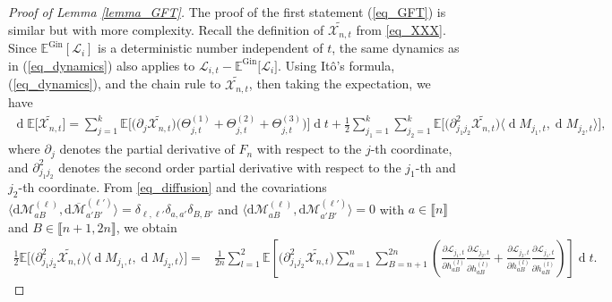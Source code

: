 \documentclass[10pt,reqno]{amsart}
\numberwithin{equation}{section}
\numberwithin{figure}{section}
\theoremstyle{plain}
\newcommand{\wt}{\widetilde}
\newcommand{\<}{\langle}
\renewcommand{\>}{\rangle}
\newcommand{\E}{\mathbb{E}}
\newcommand{\dd}{\operatorname{d}\!{}}
\begin{document}
\begin{proof}[Proof of Lemma \ref{lemma_GFT}]
	
	\medskip
	
	
	
		
	The proof of the first statement (\ref{eq_GFT}) is similar but with more complexity. Recall the definition of $\wt{\mathcal{X}_{n,t}}$ from \eqref{eq_XXX}. Since $\E^{\mathrm{Gin}}[\mathcal{L}_{i}]$ is a deterministic number independent of $t$, the same dynamics as in (\ref{eq_dynamics}) also applies to $\mathcal{L}_{i,t}-\E^{\mathrm{Gin}}\big[\mathcal{L}_{i}\big]$. Using Itô's formula, (\ref{eq_dynamics}), and the chain rule to $\wt{\mathcal{X}_{n,t}}$, then taking the expectation, we have
	\begin{align}\label{eq_derivative}
		\dd \mathbb{E}\big[ \wt{\mathcal{X}_{n,t}}\big]=\sum_{j=1}^k \mathbb{E} \Big[ \big( \partial_{j} \wt{\mathcal{X}_{n,t}}\big) \big( \Theta^{(1)}_{j,t}+\Theta^{(2)}_{j,t}+\Theta^{(3)}_{j,t} \big) \Big] \dd t + \frac{1}{2} \sum_{j_1=1}^k \sum_{j_2=1}^k  \mathbb{E}\Big[ \big(\partial^2_{j_1j_2} \wt{\mathcal{X}_{n,t}} \big) \big\< \dd M_{j_1,t}, \dd M_{j_2,t}  \big\>\Big],
	\end{align}
	 where $\partial_{j}$ denotes the partial derivative of $F_n$ with respect to the $j$-th coordinate, and $\partial^2_{j_1j_2}$ denotes the second order partial derivative with respect to the $j_1$-th and $j_2$-th coordinate. From \eqref{eq_diffusion} and the 
	covariations 
	$\langle \mathrm d \mathcal M_{aB}^{(\ell)}, 
	\mathrm d \overline{\mathcal M}_{a'B'}^{(\ell')} \rangle
	= \delta_{\ell,\ell'} \delta_{a,a'} \delta_{B,B'}$ 
	and
	$\langle \mathrm d \mathcal M_{aB}^{(\ell)}, 
	\mathrm d \mathcal M_{a'B'}^{(\ell')} \rangle
	= 0$ with $a \in 
	\llbracket n \rrbracket$ and 
	$B\in \llbracket n+1,2n \rrbracket$, we obtain
	\begin{align}\label{eq_variation}
		\frac{1}{2} \mathbb{E}\Big[ \big(\partial^2_{j_1j_2} \wt{\mathcal{X}_{n,t}} \big) \big\< \dd M_{j_1,t}, \dd M_{j_2,t}  \big\>\Big]=&
		\frac{1}{2n} \sum_{l=1}^2 \mathbb{E} \left[\big(\partial^2_{j_1j_2} \wt{\mathcal{X}_{n,t}} \big)
		\sum_{a=1}^n \sum_{B=n+1}^{2n}  \left(   \frac{ \partial \mathcal{L}_{j_1,t}}{\partial h^{(l)}_{aB}}      \frac{\partial \mathcal{L}_{j_2,t}}{\partial \overline{h^{(l)}_{aB}}} +\frac{ \partial \mathcal{L}_{j_2,t}}{\partial h^{(l)}_{aB}}      \frac{\partial \mathcal{L}_{j_1,t}}{\partial \overline{h^{(l)}_{aB}}}  \right)\right] \dd t.
	\end{align}
    

\end{proof}
\end{document}
